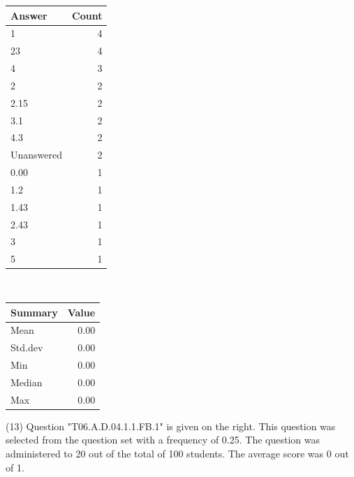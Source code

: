 \documentclass[12pt,nohyper]{tufte-handout}\usepackage[]{graphicx}\usepackage[]{color}
\begin{document}
\begin{center}%
\begin{tabular}{lr}
  \hline
Answer & Count \\ 
  \hline
1 &   4 \\ 
  23 &   4 \\ 
  4 &   3 \\ 
  2 &   2 \\ 
  2.15 &   2 \\ 
  3.1 &   2 \\ 
  4.3 &   2 \\ 
  Unanswered &   2 \\ 
  0.00 &   1 \\ 
  1.2 &   1 \\ 
  1.43 &   1 \\ 
  2.43 &   1 \\ 
  3 &   1 \\ 
  5 &   1 \\ 
   \hline
\end{tabular}
~~~~~~~~%
\begin{tabular}{lr}
  \hline
Summary & Value \\ 
  \hline
Mean & 0.00 \\ 
  Std.dev & 0.00 \\ 
  Min & 0.00 \\ 
  Median & 0.00 \\ 
  Max & 0.00 \\ 
   \hline
\end{tabular}
\end{center}\newpage{} (13) Question "T06.A.D.04.1.1.FB.1" is given on the right. This question was selected from the question set with a frequency of 0.25. The question was administered to 20 out of the total of 100 students. The average score was 0 out of 1.
\end{document}
